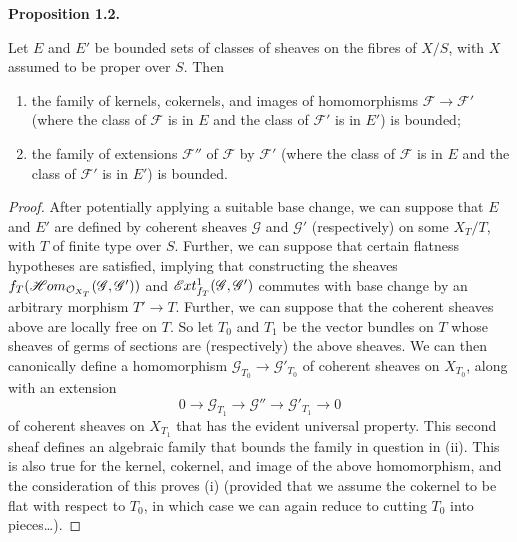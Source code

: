 \documentclass{article}
\providecommand{\tightlist}{%
  \setlength{\itemsep}{0pt}\setlength{\parskip}{0pt}}
\newenvironment{itenv}[1]
  {\phantomsection\par\smallskip\noindent\textbf{#1.}\itshape}
  {\par\smallskip}
\newcommand{\oldpage}[1]{\marginpar{\footnotesize$\Big\vert$ \textit{p.~#1}}}
\theoremstyle{definition}
\theoremstyle{definition}
\theoremstyle{definition}
\theoremstyle{definition}
\theoremstyle{remark}
\begin{document}
\hypertarget{fga-3-iv-proposition-1.2}{}
\begin{itenv}{Proposition 1.2}

Let \(E\) and \(E'\) be bounded sets of classes of sheaves on the fibres of \(X/S\), with \(X\) assumed to be proper over \(S\).
Then

\begin{enumerate}
\def\labelenumi{\roman{enumi}.}
\tightlist
\item
  the family of kernels, cokernels, and images of homomorphisms \({\mathscr{F}}\to{\mathscr{F}}'\) (where the class of \({\mathscr{F}}\) is in \(E\) and the class of \({\mathscr{F}}'\) is in \(E'\)) is bounded;
\item
  the family of extensions \({\mathscr{F}}''\) of \({\mathscr{F}}\) by \({\mathscr{F}}'\) (where the class of \({\mathscr{F}}\) is in \(E\) and the class of \({\mathscr{F}}'\) is in \(E'\)) is bounded.
\end{enumerate}

\end{itenv}

\begin{proof}
After potentially applying a suitable base change, we can suppose that \(E\) and \(E'\) are defined by coherent sheaves \({\mathscr{G}}\) and \({\mathscr{G}}'\) (respectively) on some \(X_T/T\), with \(T\) of finite type over \(S\).
Further, we can suppose that certain flatness hypotheses are satisfied, implying that constructing the sheaves \(f_T(\mathscr{H}\kern -.5pt om_{{\mathcal{O}}_{X_T}}({\mathscr{G}},{\mathscr{G}}'))\) and \(\mathscr{E}\kern -.5pt xt_{f_T}^1({\mathscr{G}},{\mathscr{G}}')\) commutes with base change by an arbitrary morphism \(T'\to T\).
Further, we can suppose that the coherent sheaves above are locally free on \(T\).
So let \(T_0\) and \(T_1\) be the vector bundles on \(T\) whose sheaves of germs of sections are (respectively) the above sheaves.
We can then canonically define a homomorphism \({\mathscr{G}}_{T_0}\to{\mathscr{G}}'_{T_0}\) of coherent sheaves on \(X_{T_0}\), along with an extension
\[
  0 \to {\mathscr{G}}_{T_1} \to {\mathscr{G}}'' \to {\mathscr{G}}'_{T_1} \to 0
\]
of coherent sheaves on \(X_{T_1}\) that has the evident universal property.
This second sheaf defines an algebraic family that bounds the family in question in (ii).
\oldpage{221-05}This is also true for the kernel, cokernel, and image of the above homomorphism, and the consideration of this proves (i) (provided that we assume the cokernel to be flat with respect to \(T_0\), in which case we can again reduce to cutting \(T_0\) into pieces\ldots).
\end{proof}
\end{document}
